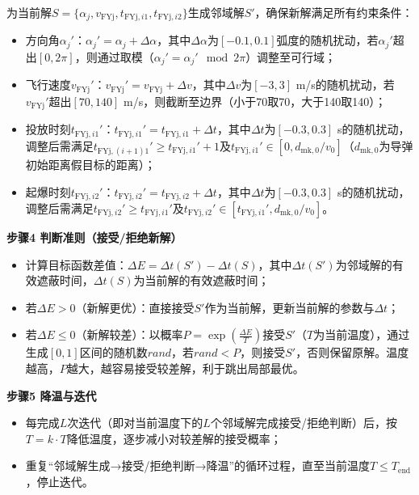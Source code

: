 \documentclass[../main.tex]{subfiles}
\begin{document}
为当前解$S=\{\alpha_j, v_{\text{FYj}}, t_{\text{FYj},i1}, t_{\text{FYj},i2}\}$生成邻域解$S'$，确保新解满足所有约束条件：
\begin{itemize}
\item 方向角$\alpha_j'$：$\alpha_j' = \alpha_j + \Delta\alpha$，其中$\Delta\alpha$为$[-0.1,0.1]$弧度的随机扰动，若$\alpha_j'$超出$[0,2\pi]$，则通过取模（$\alpha_j' = \alpha_j' \mod 2\pi$）调整至可行域；
\item 飞行速度$v_{\text{FYj}}'$：$v_{\text{FYj}}' = v_{\text{FYj}} + \Delta v$，其中$\Delta v$为$[-3,3]$ m/s的随机扰动，若$v_{\text{FYj}}'$超出$[70,140]$ m/s，则截断至边界（小于70取70，大于140取140）；
\item 投放时刻$t_{\text{FYj},i1}'$：$t_{\text{FYj},i1}' = t_{\text{FYj},i1} + \Delta t$，其中$\Delta t$为$[-0.3,0.3]$ s的随机扰动，调整后需满足$t_{\text{FYj},(i+1)1}' \geq t_{\text{FYj},i1}'+1$及$t_{\text{FYj},i1}' \in [0, d_{\text{mk},0}/v_0]$（$d_{\text{mk},0}$为导弹初始距离假目标的距离）；
\item 起爆时刻$t_{\text{FYj},i2}'$：$t_{\text{FYj},i2}' = t_{\text{FYj},i2} + \Delta t$，其中$\Delta t$为$[-0.3,0.3]$ s的随机扰动，调整后需满足$t_{\text{FYj},i2}' \geq t_{\text{FYj},i1}'$及$t_{\text{FYj},i2}' \in [t_{\text{FYj},i1}', d_{\text{mk},0}/v_0]$。
\end{itemize}

\noindent\textbf{步骤4 判断准则（接受/拒绝新解）}
\begin{itemize}
\item 计算目标函数差值：$\Delta E = \Delta t(S') - \Delta t(S)$，其中$\Delta t(S')$为邻域解的有效遮蔽时间，$\Delta t(S)$为当前解的有效遮蔽时间；
\item 若$\Delta E > 0$（新解更优）：直接接受$S'$作为当前解，更新当前解的参数与$\Delta t$；
\item 若$\Delta E \leq 0$（新解较差）：以概率$P = \exp\left(\frac{\Delta E}{T}\right)$接受$S'$（$T$为当前温度），通过生成$[0,1]$区间的随机数$rand$，若$rand < P$，则接受$S'$，否则保留原解。温度越高，$P$越大，越容易接受较差解，利于跳出局部最优。
\end{itemize}

\noindent\textbf{步骤5 降温与迭代}
\begin{itemize}
\item 每完成$L$次迭代（即对当前温度下的$L$个邻域解完成接受/拒绝判断）后，按$T = k \cdot T$降低温度，逐步减小对较差解的接受概率；
\item 重复“邻域解生成→接受/拒绝判断→降温”的循环过程，直至当前温度$T \leq T_{\text{end}}$，停止迭代。
\end{itemize}
\end{document}
